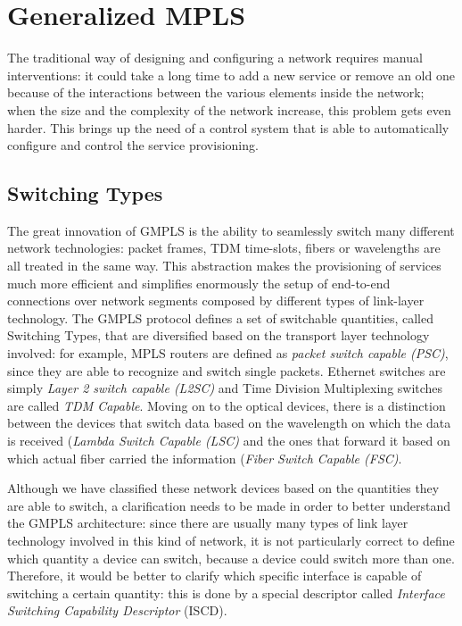 \documentclass[10pt,a4paper]{report}
\begin{document}
\section{Generalized MPLS}

The traditional way of designing and configuring a network requires
manual interventions: it could take a long time to add a new service
or remove an old one because of the interactions between the various
elements inside the network; when the size and the complexity of the
network increase, this problem gets even harder. This brings up the
need of a control system that is able to automatically configure and
control the service provisioning.

\subsection{Switching Types}

The great innovation of GMPLS is the ability to seamlessly switch many
different network technologies: packet frames, TDM time-slots, fibers
or wavelengths are all treated in the same way. This abstraction makes
the provisioning of services much more efficient and simplifies
enormously the setup of end-to-end connections over network segments
composed by different types of link-layer technology. The GMPLS
protocol defines a set of switchable quantities, called Switching
Types, that are diversified based on the transport layer technology
involved: for example, MPLS routers are defined as \textit{packet
  switch capable (PSC)}, since they are able to recognize and switch
single packets. Ethernet switches are simply \textit{Layer 2 switch
  capable (L2SC)} and Time Division Multiplexing switches are called
\textit{TDM Capable}. Moving on to the optical devices, there is a
distinction between the devices that switch data based on the
wavelength on which the data is received (\textit{Lambda Switch
  Capable (LSC)} and the ones that forward it based on which actual
fiber carried the information (\textit{Fiber Switch Capable (FSC)}.

Although we have classified these network devices based on the
quantities they are able to switch, a clarification needs to be made
in order to better understand the GMPLS architecture: since there are
usually many types of link layer technology involved in this kind of
network, it is not particularly correct to define which quantity a
device can switch, because a device could switch more than
one. Therefore, it would be better to clarify which specific interface
is capable of switching a certain quantity: this is done by a special
descriptor called \textit{Interface Switching Capability Descriptor}
(ISCD).
\end{document}
